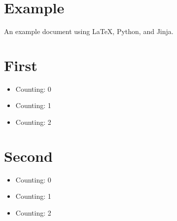 \documentclass{article}
\begin{document}
\section{Example}
An example document using \LaTeX, Python, and Jinja.

\section{First}
\begin{itemize}
  \item Counting: 0
  \item Counting: 1
  \item Counting: 2
\end{itemize}

\section{Second}

\begin{itemize}
  \item Counting: 0
  \item Counting: 1
  \item Counting: 2
\end{itemize}
\end{document}
